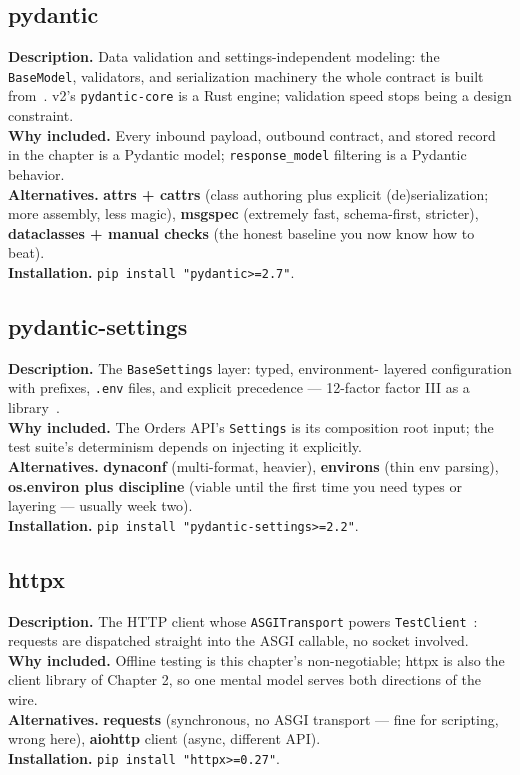 \subsection{pydantic}
\textbf{Description.} Data validation and settings-independent modeling:
the \texttt{BaseModel}, validators, and serialization machinery the whole
contract is built from~\cite{pydanticdocs}. v2's \texttt{pydantic-core} is a
Rust engine; validation speed stops being a design constraint.\\
\textbf{Why included.} Every inbound payload, outbound contract, and stored
record in the chapter is a Pydantic model; \texttt{response\_model} filtering
is a Pydantic behavior.\\
\textbf{Alternatives.} \textbf{attrs + cattrs} (class authoring plus
explicit (de)serialization; more assembly, less magic), \textbf{msgspec}
(extremely fast, schema-first, stricter), \textbf{dataclasses + manual
checks} (the honest baseline you now know how to beat).\\
\textbf{Installation.} \texttt{pip install "pydantic>=2.7"}.

\subsection{pydantic-settings}
\textbf{Description.} The \texttt{BaseSettings} layer: typed, environment-
layered configuration with prefixes, \texttt{.env} files, and explicit
precedence --- 12-factor factor III as a library~\cite{twelvefactor}.\\
\textbf{Why included.} The Orders API's \texttt{Settings} is its composition
root input; the test suite's determinism depends on injecting it explicitly.\\
\textbf{Alternatives.} \textbf{dynaconf} (multi-format, heavier),
\textbf{environs} (thin env parsing), \textbf{os.environ plus discipline}
(viable until the first time you need types or layering --- usually week
two).\\
\textbf{Installation.} \texttt{pip install "pydantic-settings>=2.2"}.

\subsection{httpx}
\textbf{Description.} The HTTP client whose \texttt{ASGITransport} powers
\texttt{TestClient}~\cite{httpxdocs}: requests are dispatched straight into
the ASGI callable, no socket involved.\\
\textbf{Why included.} Offline testing is this chapter's non-negotiable;
httpx is also the client library of Chapter 2, so one mental model serves
both directions of the wire.\\
\textbf{Alternatives.} \textbf{requests} (synchronous, no ASGI transport ---
fine for scripting, wrong here), \textbf{aiohttp} client (async, different
API).\\
\textbf{Installation.} \texttt{pip install "httpx>=0.27"}.

